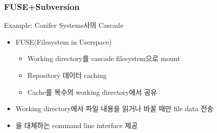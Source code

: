 \begin{frame}
\frametitle{FUSE+Subversion}

Example: Conifer Systems사의 Cascade

\begin{center}
\end{center}

\begin{itemize}
\item FUSE(Filesystem in Userspace) 
  \begin{itemize}
  \item Working directory를 cascade filesystem으로 mount
  \item Repository 데이터 caching
  \item Cache를 복수의 working directory에서 공유
  \end{itemize}
\item Working directory에서 파일 내용을 읽거나 바꿀 때만 file data 전송 
\item {}을 대체하는  command line interface 제공
\end{itemize}


\end{frame}
